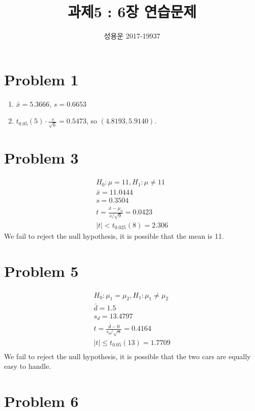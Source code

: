 \documentclass{article}
\title{과제5 : 6장 연습문제}
\author{성용운 2017-19937}
\date{}
\begin{document}
\maketitle

\section*{Problem 1}

\begin{enumerate}
	\item $\bar{x} = 5.3666$, $s = 0.6653$
	\item $t_{0.05}(5) \cdot \frac{s}{\sqrt{6}} = 0.5473$, so $(4.8193, 5.9140)$.
\end{enumerate}

\section*{Problem 3}

\begin{gather*}
	H_0: \mu = 11, H_1: \mu \ne 11 \\
	\bar{x} = 11.0444 \\
	s = 0.3504 \\
	t = \frac{\bar{x}-\mu_0}{s / \sqrt{9}} = 0.0423 \\
	|t| < t_{0.025}(8) = 2.306
\end{gather*}
We fail to reject the null hypothesis, it is possible that the mean is 11.

\section*{Problem 5}

\begin{gather*}
	H_0: \mu_1 = \mu_2, H_1: \mu_1 \ne \mu_2 \\
	\bar{d} = 1.5 \\
	s_d = 13.4797 \\
	t = \frac{\bar{d}-0}{s_d / \sqrt{n}} = 0.4164 \\
	|t| \le t_{0.05}(13) = 1.7709 \\
\end{gather*}
We fail to reject the null hypothesis, it is possible that the two cars are
equally easy to handle.

\section*{Problem 6}
\end{document}
